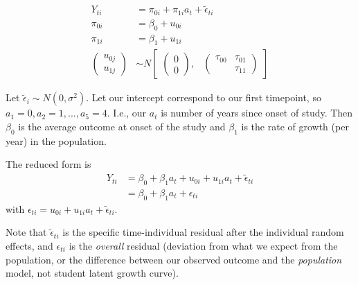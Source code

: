 \documentclass[
  letterpaper,
  DIV=11,
  numbers=noendperiod]{scrreprt}
\begin{document}
\[\begin{aligned}
Y_{ti} &= \pi_{0i} + \pi_{1i} a_t + \tilde{\epsilon}_{ti} \\
\pi_{0i} &=  \beta_{0} + u_{0i} \\
\pi_{1i} &= \beta_{1} + u_{1i} \\
\begin{pmatrix} u_{0j} \\
u_{1j}
\end{pmatrix} &\sim  N
\begin{bmatrix}
\begin{pmatrix}
0 \\
0
\end{pmatrix}\!\!,&
\begin{pmatrix}
\tau_{00} & \tau_{01} \\
        & \tau_{11} 
\end{pmatrix}
\end{bmatrix}
\end{aligned}\]

Let \(\tilde{\epsilon}_i \sim N(0, \sigma^2)\). Let our intercept
correspond to our first timepoint, so
\(a_1 = 0, a_2 = 1, ..., a_5 = 4\). I.e., our \(a_t\) is number of years
since onset of study. Then \(\beta_{0}\) is the average outcome at onset
of the study and \(\beta_{1}\) is the rate of growth (per year) in the
population.

The reduced form is \[\begin{aligned}
 Y_{ti} &= \beta_{0}  + \beta_{1}  a_t  + u_{0i} + u_{1i} a_t + \tilde{\epsilon}_{ti} \\ 
 &= \beta_{0}  + \beta_{1}  a_t  + \epsilon_{ti} 
\end{aligned}\] with
\(\epsilon_{ti} = u_{0i} + u_{1i} a_t + \tilde{\epsilon}_{ti}\).

Note that \(\tilde{\epsilon}_{ti}\) is the specific time-individual
residual after the individual random effects, and \(\epsilon_{ti}\) is
the \emph{overall} residual (deviation from what we expect from the
population, or the difference between our observed outcome and the
\emph{population} model, not student latent growth curve).
\end{document}
